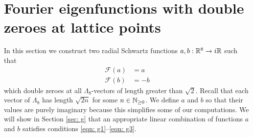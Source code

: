   \section{Fourier eigenfunctions with double zeroes at lattice points}\label{sec: fourier double zeroes}
  In this section we construct two radial Schwartz functions $a,b:\mathbb{R}^8\to i\mathbb{R}$ such that
  \begin{align}\mathcal{F}(a)&=a\label{eqn: a fourier}\\
   \mathcal{F}(b)&=-b\label{eqn: b fourier}
  \end{align}
  which double zeroes at all $\Lambda_8$-vectors of length greater than $\sqrt{2}$. Recall that each vector of $\Lambda_8$ has length $\sqrt{2n}$ for some $n\in\mathbb{N}_{\geq 0}$. We define $a$ and $b$ so that their values are purely imaginary because this simplifies some of our computations. We will show in Section \ref{sec: g} that an appropriate linear combination of functions $a$ and $b$ satisfies conditions \eqref{eqn: g1}--\eqref{eqn: g3}.

